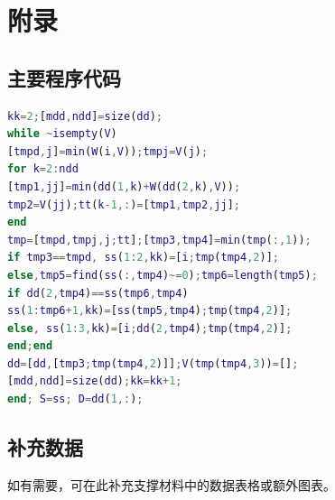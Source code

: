 
\newpage
\section{附录}

\subsection{主要程序代码}

\begin{lstlisting}[language=matlab]
kk=2;[mdd,ndd]=size(dd);
while ~isempty(V)
[tmpd,j]=min(W(i,V));tmpj=V(j);
for k=2:ndd
[tmp1,jj]=min(dd(1,k)+W(dd(2,k),V));
tmp2=V(jj);tt(k-1,:)=[tmp1,tmp2,jj];
end
tmp=[tmpd,tmpj,j;tt];[tmp3,tmp4]=min(tmp(:,1));
if tmp3==tmpd, ss(1:2,kk)=[i;tmp(tmp4,2)];
else,tmp5=find(ss(:,tmp4)~=0);tmp6=length(tmp5);
if dd(2,tmp4)==ss(tmp6,tmp4)
ss(1:tmp6+1,kk)=[ss(tmp5,tmp4);tmp(tmp4,2)];
else, ss(1:3,kk)=[i;dd(2,tmp4);tmp(tmp4,2)];
end;end
dd=[dd,[tmp3;tmp(tmp4,2)]];V(tmp(tmp4,3))=[];
[mdd,ndd]=size(dd);kk=kk+1;
end; S=ss; D=dd(1,:);
 \end{lstlisting}

 \subsection{补充数据}

如有需要，可在此补充支撑材料中的数据表格或额外图表。
